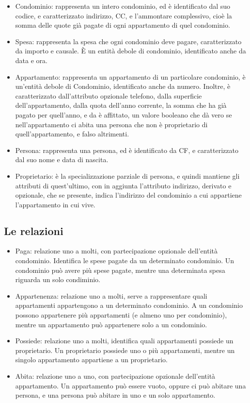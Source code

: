\begin{itemize}
    \item Condominio: rappresenta un intero condominio, ed è identificato dal suo codice, e caratterizzato indirizzo, CC, 
                      e l'ammontare complessivo, cioè la somma delle quote già pagate di ogni appartamento di quel condominio.
    \item Spesa: rappresenta la spesa che ogni condominio deve pagare, caratterizzato da importo e causale.
                 È un entità debole di condominio, identificato anche da data e ora.
    \item Appartamento: rappresenta un appartamento di un particolare condominio, è un'entità debole di Condominio, identificato anche da numero.
                        Inoltre, è caratterizzato dall'attributo opzionale telefono, dalla superficie dell'appartamento, 
                        dalla quota dell'anno corrente, la somma che ha già pagato per quell'anno, e da è affittato, un valore booleano
                        che dà vero se nell'appartamento ci abita una persona che non è proprietario di quell'appartamento, e falso altrimenti.
    \item Persona: rappresenta una persona, ed è identificato da CF, e caratterizzato dal suo nome e data di nascita.
    \item Proprietario: è la specializzazione parziale di persona, e quindi mantiene gli attributi di quest'ultimo,
                        con in aggiunta l'attributo indirizzo, derivato e opzionale, che se presente,
                        indica l'indirizzo del condominio a cui appartiene l'appartamento in cui vive.                        
\end{itemize}

\subsection{Le relazioni}

\begin{itemize}
	\item Paga: relazione uno a molti, con partecipazione opzionale dell'entità condominio. Identifica le spese pagate da un determinato condominio. Un condominio può avere più spese pagate, mentre una determinata spesa riguarda un solo condiminio.
 	\item Appartenenza: relazione uno a molti, serve a rappresentare quali appartamenti appartengono a un determinato condominio. A un condominio possono appartenere più appartamenti (e almeno uno per condominio), mentre un appartamento può appartenere solo a un condominio.
  	\item Possiede: relazione uno a molti, identifica quali appartamenti possiede un proprietario. Un proprietario possiede uno o più appartamenti, mentre un singolo appartamento appartiene a un proprietario.
   	\item Abita: relazione uno a uno, con partecipazione opzionale dell'entità appartamento. Un appartamento può essere vuoto, oppure ci può abitare una persona, e una persona può abitare in uno e un solo appartamento.
\end{itemize}
